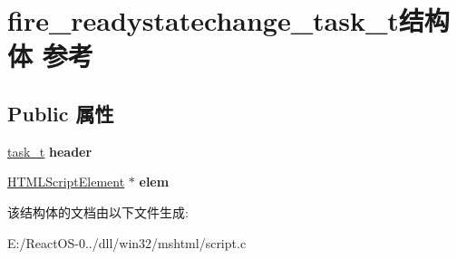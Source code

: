 \hypertarget{structfire__readystatechange__task__t}{}\section{fire\+\_\+readystatechange\+\_\+task\+\_\+t结构体 参考}
\label{structfire__readystatechange__task__t}
\subsection*{Public 属性}
\begin{DoxyCompactItemize}
\item 
\mbox{\label{structfire__readystatechange__task__t_a8ce6dc0c392f8634cbfffe93dc9484d3}} 
\hyperlink{structtask__t}{task\+\_\+t} {\bfseries header}
\item 
\mbox{\label{structfire__readystatechange__task__t_a702f3d0ff1e0aea96ae0b4d83c94f029}} 
\hyperlink{struct_h_t_m_l_script_element}{H\+T\+M\+L\+Script\+Element} $\ast$ {\bfseries elem}
\end{DoxyCompactItemize}


该结构体的文档由以下文件生成\+:\begin{DoxyCompactItemize}
\item 
E\+:/\+React\+O\+S-\/0../dll/win32/mshtml/script.\+c\end{DoxyCompactItemize}
